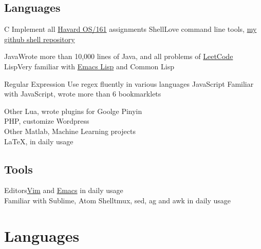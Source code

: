 \documentclass[11pt,a4paper,nolmodern]{moderncv}
\begin{document}
\subsection{Languages}
\cvcomputer
{C}{
  Implement all \href{http://www.eecs.harvard.edu/~syrah/os161/}{Havard OS/161} assignments
}
{Shell}{Love command line tools, \href{https://github.com/xcv58/Shell_script}{my github shell repository}}

\cvcomputer
{Java}{Wrote more than 10,000 lines of Java, and all problems of \href{https://dl.dropboxusercontent.com/u/4121165/LeetCode/All-sort-by-ac.png}{LeetCode}}
{Lisp}{Very familiar with \href{https://github.com/xcv58/Emacs_config}{Emacs Lisp} and Common Lisp}

\cvcomputer
{Regular Expression}{
  Use regex fluently in various languages
}
{JavaScript}{
  Familiar with JavaScript, wrote more than 6 bookmarklets\\
}

\cvcomputer
{Other}{
  Lua, wrote plugins for Goolge Pinyin\\
  PHP, customize Wordpress\\
}
{Other}{
  Matlab, Machine Learning projects\\
  {\LaTeX}, in daily usage
}

\subsection{Tools}
\cvcomputer
{Editors}{\href{https://github.com/xcv58/Vim_config}{Vim} and \href{https://github.com/xcv58/Emacs_config}{Emacs} in daily usage\\
Familiar with Sublime, Atom}
{Shell}{tmux, sed, ag and awk in daily usage}

\section{Languages}

\end{document}
